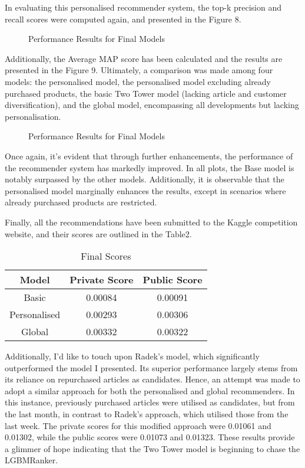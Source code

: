 \documentclass[conference,compsoc]{IEEEtran}
\begin{document}
In evaluating this personalised recommender system, the top-k precision and recall scores were computed again, and presented in the Figure 8.
\begin{figure}[htbp]
    \centering
    \caption{Performance Results for Final Models}
    \label{fig:example}
\end{figure}
Additionally, the Average MAP score has been calculated and the results are presented in the Figure 9. Ultimately, a comparison was made among four models: the personalised model, the personalised model excluding already purchased products, the basic Two Tower model (lacking article and customer diversification), and the global model, encompassing all developments but lacking personalisation.
\begin{figure}[htbp]
    \centering
    \caption{Performance Results for Final Models}
    \label{fig:example}
\end{figure}

Once again, it's evident that through further enhancements, the performance of the recommender system has markedly improved. In all plots, the Base model is notably surpassed by the other models. Additionally, it is observable that the personalised model marginally enhances the results, except in scenarios where already purchased products are restricted.

Finally, all the recommendations have been submitted to the Kaggle competition website, and their scores are outlined in the Table2.

\begin{table}[htbp]
    \centering
    \caption{Final Scores}
    \begin{tabular}{|c|c|c|}
        \hline
        Model & Private Score & Public Score \\
        \hline
        Basic & 0.00084 & 0.00091 \\
        Personalised & 0.00293 & 0.00306 \\
        Global & 0.00332 & 0.00322 \\
        \hline
    \end{tabular}
    \label{tab:example}
\end{table}

Additionally, I'd like to touch upon Radek’s model, which significantly outperformed the model I presented. Its superior performance largely stems from its reliance on repurchased articles as candidates. Hence, an attempt was made to adopt a similar approach for both the personalised and global recommenders. In this instance, previously purchased articles were utilised as candidates, but from the last month, in contrast to Radek's approach, which utilised those from the last week. The private scores for this modified approach were 0.01061 and 0.01302, while the public scores were 0.01073 and 0.01323. These results provide a glimmer of hope indicating that the Two Tower model is beginning to chase the LGBMRanker.
\end{document}
